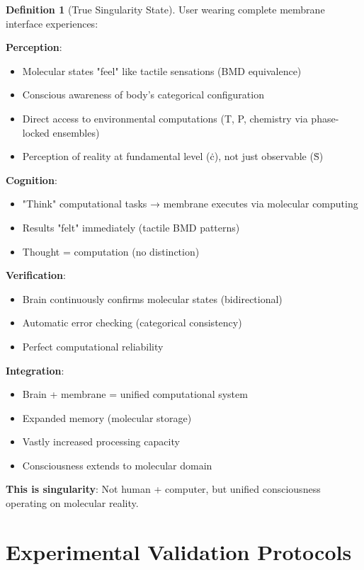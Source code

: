 \documentclass[11pt,a4paper]{article}
\theoremstyle{definition}
\newtheorem{definition}[theorem]{Definition}
\theoremstyle{remark}
\begin{document}
\begin{definition}[True Singularity State]
User wearing complete membrane interface experiences:

\textbf{Perception}:
\begin{itemize}
\item Molecular states "feel" like tactile sensations (BMD equivalence)
\item Conscious awareness of body's categorical configuration
\item Direct access to environmental computations (T, P, chemistry via phase-locked ensembles)
\item Perception of reality at fundamental level (ċ), not just observable (Ṡ)
\end{itemize}

\textbf{Cognition}:
\begin{itemize}
\item "Think" computational tasks → membrane executes via molecular computing
\item Results "felt" immediately (tactile BMD patterns)
\item Thought = computation (no distinction)
\end{itemize}

\textbf{Verification}:
\begin{itemize}
\item Brain continuously confirms molecular states (bidirectional)
\item Automatic error checking (categorical consistency)
\item Perfect computational reliability
\end{itemize}

\textbf{Integration}:
\begin{itemize}
\item Brain + membrane = unified computational system
\item Expanded memory (molecular storage)
\item Vastly increased processing capacity
\item Consciousness extends to molecular domain
\end{itemize}

\textbf{This is singularity}: Not human + computer, but unified consciousness operating on molecular reality.
\end{definition}

\section{Experimental Validation Protocols}
\end{document}

